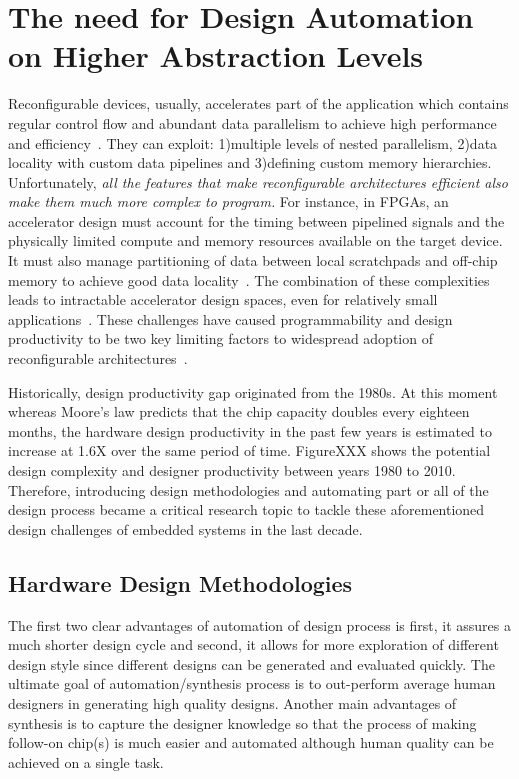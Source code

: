\section{The need for Design Automation on Higher Abstraction Levels}

Reconfigurable devices, usually, accelerates part of the application which contains regular control flow and abundant data parallelism to achieve high performance and efficiency~\cite{spatial_computation, trips, govindaraju_hpca_2011}.
They can exploit: 1)multiple levels of nested parallelism, 2)data locality with custom data pipelines and 3)defining custom memory hierarchies.
Unfortunately, \textit{all the features that make reconfigurable architectures efficient also make them much more complex to program.}
For instance, in FPGAs, an accelerator design must account for the timing between pipelined signals and the physically limited compute and memory resources available on the target device.
It must also manage partitioning of data between local scratchpads and off-chip memory to achieve good data locality~\cite{gzip_2013_fpga}.
The combination of these complexities leads to intractable accelerator design spaces, even for relatively small applications~\cite{cascaval_taxonomy_accelerator}.
These challenges have caused programmability and design productivity to be two key limiting factors to widespread adoption of reconfigurable architectures~\cite{fpga_masses, cgra_architecture}.

Historically, design productivity gap originated from the 1980s. At this moment whereas Moore's law predicts that the chip capacity doubles every eighteen months, the hardware design productivity in the past few years is estimated to increase at 1.6X over the same period of time.
FigureXXX shows the potential design complexity and designer productivity between years 1980 to 2010.
Therefore, introducing design methodologies and automating part or all of the design process became a critical research topic to tackle these aforementioned design challenges of embedded systems in the last decade.



\subsection{Hardware Design Methodologies}

The first two clear advantages of automation of design process is first, it assures a much shorter design cycle and second, it allows for more exploration of different design style since different designs can be generated and evaluated quickly.
The ultimate goal of automation/synthesis  process is to out-perform average human designers in generating high quality designs. Another main advantages of synthesis is to capture the designer knowledge so that the process of making follow-on chip(s) is much easier and automated although human quality can be achieved on a single task.

